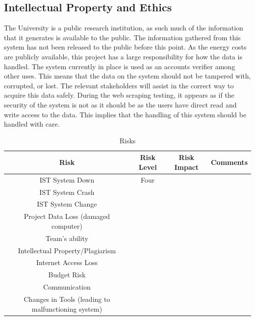 \documentclass[12pt,onecolumn]{IEEEtran}
\begin{document}
\subsection{Intellectual Property and Ethics} \label{sec:IntellectualPropertyEthics}

The University is a public research institution, as such much of the information that it generates is available to the public. The information gathered from this system has not been released to the public before this point.  As the energy costs are publicly available, this project has a large responsibility for how the data is handled. The system currently in place is used as an accounts verifier among other uses. This means that the data on the system should not be tampered with, corrupted, or lost.  The relevant stakeholders will assist in the correct way to acquire this data safely. During the web scraping testing, it appears as if the security of the system is not as it should be as the users have direct read and write access to the data.
This implies that the handling of this system should be handled with care.


\begin{table}[!t]
\renewcommand{\arraystretch}{1.3}
\caption{Risks}
\label{tab:risks}
\centering
\begin{tabular}{|c||c||c||c|}
\hline
Risk & Risk Level & Risk Impact & Comments \\
\hline
IST System Down & Four & & \\
IST System Crash & & & \\
IST System Change & & & \\
Project Data Loss (damaged computer) & & & \\
Team's ability & & & \\
Intellectual Property/Plagiarism & & & \\
Internet Access Loss & & & \\
Budget Risk & & & \\
Communication & & & \\
Changes in Tools (leading to malfunctioning system) & & & \\

\hline
\end{tabular}
\end{table}
\end{document}
